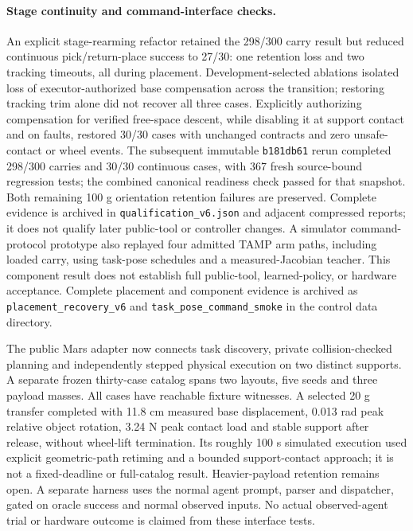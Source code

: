 \paragraph{Stage continuity and command-interface checks.}
An explicit stage-rearming refactor retained the 298/300 carry result but reduced
continuous pick/return-place success to 27/30: one retention loss and two tracking
timeouts, all during placement. Development-selected ablations isolated loss of
executor-authorized base compensation across the transition; restoring tracking
trim alone did not recover all three cases. Explicitly authorizing compensation
for verified free-space descent, while disabling it at support contact and on
faults, restored 30/30 cases with unchanged contracts and zero unsafe-contact or
wheel events. The subsequent immutable \texttt{b181db61} rerun completed 298/300
carries and 30/30 continuous cases, with 367 fresh source-bound regression tests;
the combined canonical readiness check passed for that snapshot. Both remaining
100 g orientation retention failures are preserved. Complete evidence is archived
in \texttt{qualification\_v6.json} and adjacent compressed reports; it does not
qualify later public-tool or controller changes. A simulator command-protocol prototype also replayed four
admitted TAMP arm paths, including loaded carry, using task-pose schedules and
a measured-Jacobian teacher. This component result does not establish full
public-tool, learned-policy, or hardware acceptance. Complete placement and
component evidence is archived as \texttt{placement\_recovery\_v6} and
\texttt{task\_pose\_command\_smoke} in the control data directory.

The public Mars adapter now connects task discovery, private collision-checked
planning and independently stepped physical execution on two distinct supports.
A separate frozen thirty-case catalog spans two layouts, five seeds and three
payload masses. All cases have reachable fixture witnesses. A selected 20 g
transfer completed with 11.8 cm measured base displacement, 0.013 rad peak relative
object rotation, 3.24 N peak contact load and stable support after release, without
wheel-lift termination. Its roughly 100 s simulated execution used explicit
geometric-path retiming and a bounded support-contact approach; it is not a
fixed-deadline or full-catalog result. Heavier-payload retention remains open. A
separate harness uses the normal agent prompt, parser and dispatcher, gated on
oracle success and normal observed inputs. No actual observed-agent trial or
hardware outcome is claimed from these interface tests.

